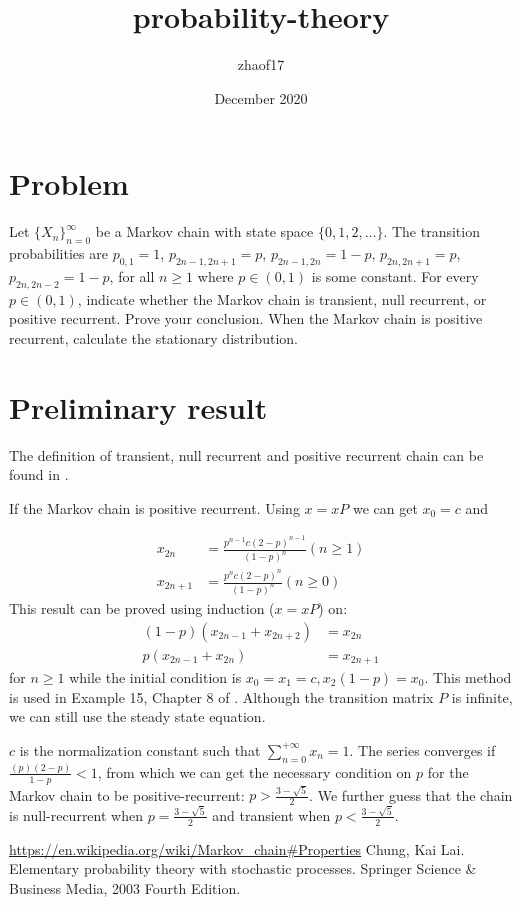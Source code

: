\documentclass{article}
\title{probability-theory}
\author{zhaof17 }
\date{December 2020}
\begin{document}
\maketitle
\section{Problem}
Let $\{X_n\}_{n=0}^{\infty}$
be a Markov chain with state space
$\{0,1,2,\dots\}$.
The transition probabilities are
$p_{0,1}=1$,
$p_{2n-1, 2n+1} = p$,
$p_{2n-1, 2n} = 1-p$,
$p_{2n, 2n+1} = p$,
$p_{2n, 2n-2} = 1-p$,
for all $n\geq 1$ where $p\in (0,1)$ is some constant.
For every $p\in (0,1)$,
indicate whether the Markov chain is transient,
null recurrent, or positive recurrent.
Prove your conclusion. When the Markov chain is
positive recurrent, calculate the stationary
distribution.
\section{Preliminary result}
The definition of transient, null recurrent and positive
recurrent chain can be found in \cite{def}.

If the Markov chain is positive recurrent. Using
$x = x P$ we can get $x_0 = c$ and

\begin{align*}
x_{2n} &= \frac{p^{n-1} c (2-p)^{n-1}}{(1-p)^n} (n\geq 1) \\
x_{2n+1} & = \frac{p^n c (2-p)^n}{(1-p)^n} (n\geq 0)
\end{align*}
This result can be proved using induction ($x=xP$) on:
\begin{align*}
    (1-p)(x_{2n-1} + x_{2n+2}) &= x_{2n} \\
    p(x_{2n-1} + x_{2n}) &= x_{2n+1}
\end{align*} for $n\geq 1$
while the initial condition is
$x_0=x_1=c, x_2(1-p)=x_0$.
This method is used in Example 15, Chapter 8 of \cite{prob}.
Although the transition matrix $P$ is infinite, we can
still use the steady state equation.

$c$ is the normalization constant such that
$\sum_{n=0}^{+\infty} x_n = 1$.
The series converges if $\frac{(p)(2-p)}{1-p} < 1$,
from which we can get the necessary condition on $p$ for
the Markov chain to be positive-recurrent:
$p > \frac{3-\sqrt{5}}{2}$.
We further guess that the chain is null-recurrent
when $p=\frac{3-\sqrt{5}}{2}$
and transient when $p<\frac{3-\sqrt{5}}{2}$.
\begin{thebibliography}{9}
 \url{https://en.wikipedia.org/wiki/Markov_chain#Properties}
 Chung, Kai Lai. Elementary probability theory with stochastic processes. Springer Science \& Business Media, 2003 Fourth Edition.
\end{thebibliography}
\end{document}

